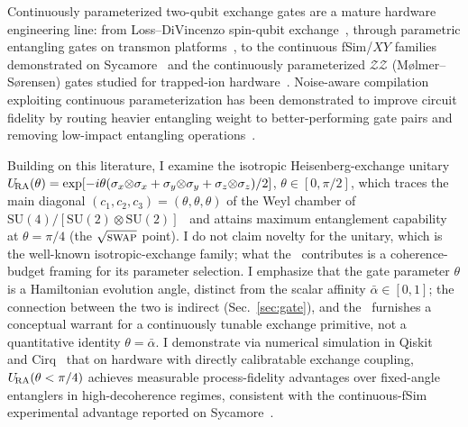 Continuously parameterized two-qubit exchange gates are a mature
hardware engineering line: from Loss--DiVincenzo
spin-qubit exchange~\cite{LossDiVincenzo1998}, through parametric
entangling gates on transmon platforms~\cite{Caldwell2018}, to the
continuous fSim/$XY$ families demonstrated on
Sycamore~\cite{Foxen2020,Abrams2020,Lacroix2020} and the
continuously parameterized $\mathcal{ZZ}$ (M\o{}lmer--S\o{}rensen)
gates studied for trapped-ion hardware~\cite{Yale2025NoiseAware}.
Noise-aware compilation exploiting continuous parameterization has
been demonstrated to improve circuit fidelity by routing heavier
entangling weight to better-performing gate pairs and removing
low-impact entangling operations~\cite{Yale2025NoiseAware}.

Building on this literature, I examine the isotropic Heisenberg-exchange
unitary
$U_{\!\mathrm{RA}}(\theta) = \exp[-i\theta(\sigma_x{\otimes}\sigma_x +
\sigma_y{\otimes}\sigma_y + \sigma_z{\otimes}\sigma_z)/2]$,
$\theta \in [0,\pi/2]$, which traces the main diagonal
$(c_1,c_2,c_3)=(\theta,\theta,\theta)$ of the Weyl chamber of
$\mathrm{SU}(4)/[\mathrm{SU}(2)\otimes\mathrm{SU}(2)]$~\cite{Zhang2003WeylChamber}
and attains maximum entanglement capability at $\theta = \pi/4$ (the
$\sqrt{\textsc{swap}}$ point).
I do not claim novelty for the unitary, which is the well-known
isotropic-exchange family; what the \RCF~contributes is a coherence-budget
framing for its parameter selection.
I emphasize that the gate parameter $\theta$ is a Hamiltonian evolution
angle, distinct from the scalar affinity $\bar\alpha \in [0,1]$; the
connection between the two is indirect (Sec.~\ref{sec:gate}), and the
\RCF~furnishes a conceptual warrant for a continuously tunable exchange
primitive, not a quantitative identity $\theta = \bar\alpha$.
I demonstrate via numerical simulation in
Qiskit~\cite{Qiskit2024} and Cirq~\cite{Cirq2025} that on hardware
with directly calibratable exchange coupling, $U_{\!\mathrm{RA}}(\theta < \pi/4)$
achieves measurable process-fidelity advantages over fixed-angle
entanglers in high-decoherence regimes, consistent with the
continuous-fSim experimental advantage reported on
Sycamore~\cite{Foxen2020}.

